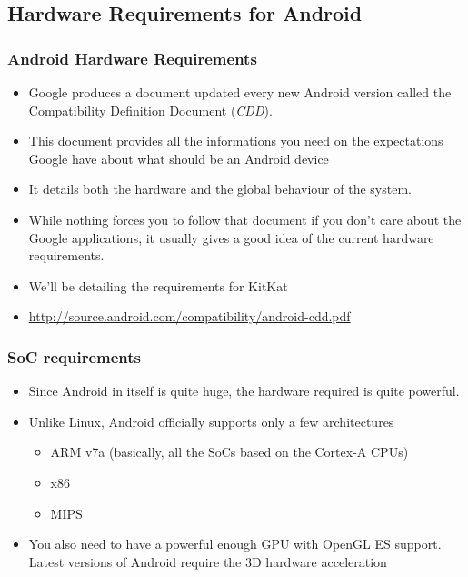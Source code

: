 \subsection{Hardware Requirements for Android}

\begin{frame}
  \frametitle{Android Hardware Requirements}
  \begin{itemize}
  \item Google produces a document updated every new Android version
    called the Compatibility Definition Document (\emph{CDD}).
  \item This document provides all the informations you need on the
    expectations Google have about what should be an Android device
  \item It details both the hardware and the global behaviour of the
    system.
  \item While nothing forces you to follow that document if you don't
    care about the Google applications, it usually gives a good idea
    of the current hardware requirements.
  \item We'll be detailing the requirements for KitKat
  \item \url{http://source.android.com/compatibility/android-cdd.pdf}
  \end{itemize}
\end{frame}

\begin{frame}
  \frametitle{SoC requirements}
  \begin{itemize}
  \item Since Android in itself is quite huge, the hardware required
    is quite powerful.
  \item Unlike Linux, Android officially supports only a few
    architectures
    \begin{itemize}
    \item ARM v7a (basically, all the SoCs based on the Cortex-A CPUs)
    \item x86
    \item MIPS
    \end{itemize}
  \item You also need to have a powerful enough GPU with OpenGL ES
    support. Latest versions of Android require the 3D hardware
    acceleration
  \end{itemize}
\end{frame}

